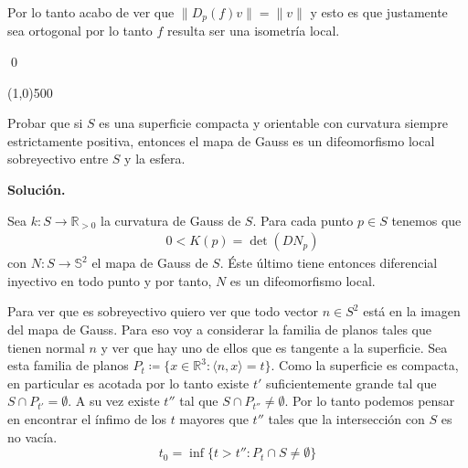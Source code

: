 \documentclass{article}
\newenvironment{exercise}[2][Ejercicio]{\begin{trivlist}
		\item[\hskip \labelsep {\bfseries #1}\hskip \labelsep {\bfseries #2.}]}{\end{trivlist}}
\newcommand{\R}{\mathbb R}
\begin{document}
\begin{exercise}{1}
\begin{itemize}
			Por lo tanto acabo de ver que $\| D_p(f)v \| = \|v\|$ y esto es que justamente sea ortogonal por lo tanto $f$ resulta ser una isometría local.
			
			\qed
			
			\line(1,0){500}
			
			\bigskip
			
			
		\end{itemize}
	\end{exercise}
	
	\begin{exercise}{2} 
		Probar que si $S$ es una superficie compacta y orientable con curvatura siempre estrictamente positiva, entonces el mapa de Gauss es un difeomorfismo local sobreyectivo entre $S$ y la esfera.
	\end{exercise}

	\textbf{Solución.}
	
	Sea $k : S \to \R_{>0}$ la curvatura de Gauss de $S$. Para cada punto $p \in S$ tenemos que
	\begin{align*}
	& 0 < K(p) =  \det(DN_p)
	\end{align*}
	con $N : S \to \mathbb{S}^2$ el mapa de Gauss de $S$. \'Este \'ultimo tiene entonces diferencial inyectivo en todo punto y por tanto, $N$ es un difeomorfismo local.
	
	Para ver que es sobreyectivo quiero ver que todo vector $n \in S^2$ está en la imagen del mapa de Gauss. Para eso voy a considerar la familia de planos tales que tienen normal $n$ y ver que hay uno de ellos que es tangente a la superficie. Sea esta familia de planos $P_t \coloneqq \{x\in \R^3 : \langle n,x \rangle =t\}$. Como la superficie es compacta, en particular es acotada por lo tanto existe $t'$ suficientemente grande tal que $S \cap P_{t'} = \emptyset$. A su vez existe $t''$ tal que $S \cap P_{t''} \neq \emptyset$. Por lo tanto podemos pensar en encontrar el ínfimo de los $t$ mayores que $t''$ tales que la intersección con $S$ es no vacía.
	\[ t_0 = \inf \{t>t'' : P_t \cap S \neq \emptyset \} \]
	
\end{document}
